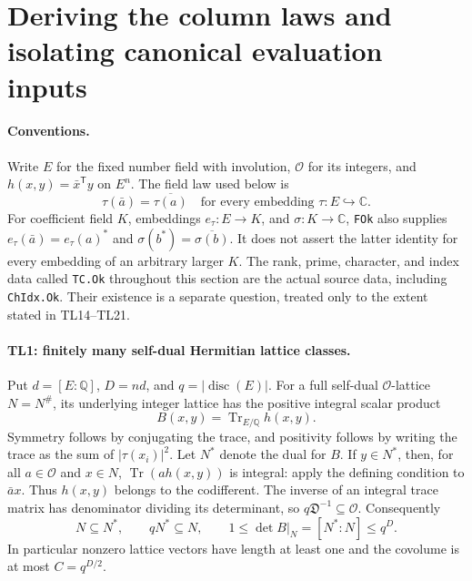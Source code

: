 \section{Deriving the column laws and isolating canonical evaluation inputs}
\label{sec:column-laws}


\paragraph{Conventions.}
Write $E$ for the fixed number field with involution, $\mathcal O$ for
its integers, and $h(x,y)=\bar x^{\mathsf T}y$ on $E^n$. The field law
used below is
\[
 \tau(\bar a)=\overline{\tau(a)}
 \quad\text{for every embedding }\tau:E\hookrightarrow\mathbb C.
 \tag{TL.1}
\]
For coefficient field $K$, embeddings $e_\tau:E\to K$, and
$\sigma:K\to\mathbb C$, \texttt{FOk} also supplies
$e_\tau(\bar a)=e_\tau(a)^*$ and
$\sigma(b^*)=\overline{\sigma(b)}$. It does not assert the latter
identity for every embedding of an arbitrary larger $K$.
The rank, prime, character, and index data called \texttt{TC.Ok}
throughout this section are the actual source data, including
\texttt{ChIdx.Ok}. Their existence is a separate question, treated
only to the extent stated in TL14--TL21.

\paragraph{TL1: finitely many self-dual Hermitian lattice classes.}
Put $d=[E:\mathbb Q]$, $D=nd$, and $q=|\operatorname{disc}(E)|$.
For a full self-dual $\mathcal O$-lattice $N=N^\#$, its underlying
integer lattice has the positive integral scalar product
\[
 B(x,y)=\operatorname{Tr}_{E/\mathbb Q}h(x,y).
 \tag{TL.2}
\]
Symmetry follows by conjugating the trace, and positivity follows by
writing the trace as the sum of $|\tau(x_i)|^2$. Let $N^*$ denote the
dual for $B$. If $y\in N^*$, then, for all $a\in\mathcal O$ and
$x\in N$, $\operatorname{Tr}(a h(x,y))$ is integral: apply the defining
condition to $\bar a x$. Thus $h(x,y)$ belongs to the codifferent.
The inverse of an integral trace matrix has denominator dividing its
determinant, so $q\mathfrak D^{-1}\subseteq\mathcal O$. Consequently
\[
 N\subseteq N^*,\qquad qN^*\subseteq N,\qquad
 1\le\det B|_N=[N^*:N]\le q^D.                 \tag{TL.3}
\]
In particular nonzero lattice vectors have length at least one and the
covolume is at most $C=q^{D/2}$.

